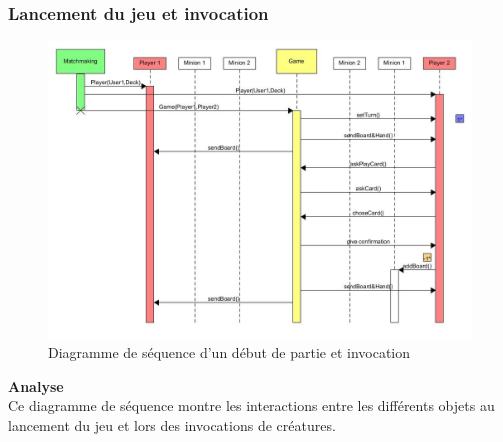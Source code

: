 \subsubsection{Lancement du jeu et invocation}
{
\begin{figure}[H]
    \includegraphics[width=1\textwidth,height=1\textwidth]{Images/CreationAndInvocation.jpg}
    \caption{\label{Sequence Diagram Partie}Diagramme de séquence d'un début de partie et invocation}
\end{figure}
\noindent\textbf{Analyse}\\
Ce diagramme de séquence montre les interactions entre les différents objets au lancement du jeu et lors des invocations de créatures.
}
